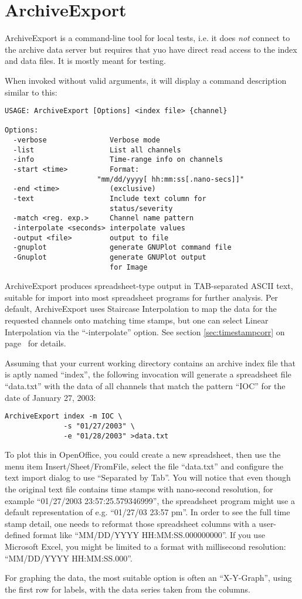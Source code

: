 \chapter{ArchiveExport}
ArchiveExport is a command-line tool for local tests, i.e. it does
\emph{not} connect to the archive data server but requires that
yuo have direct read access to the index and data files.
It is mostly meant for testing.

When invoked without valid arguments, it will display a command
description similar to this:

\begin{lstlisting}[frame=none,keywordstyle=\sffamily]
USAGE: ArchiveExport [Options] <index file> {channel}
 
Options:
  -verbose               Verbose mode
  -list                  List all channels
  -info                  Time-range info on channels
  -start <time>          Format:
                      "mm/dd/yyyy[ hh:mm:ss[.nano-secs]]"
  -end <time>            (exclusive)
  -text                  Include text column for
                         status/severity
  -match <reg. exp.>     Channel name pattern
  -interpolate <seconds> interpolate values
  -output <file>         output to file
  -gnuplot               generate GNUPlot command file
  -Gnuplot               generate GNUPlot output
                         for Image
\end{lstlisting}

\noindent ArchiveExport produces spreadsheet-type output in
TAB-separated ASCII text, suitable for import into most spreadsheet
programs for further analysis. Per default, ArchiveExport uses
Staircase Interpolation to map the data for the requested channels
onto matching time stamps, but one can select Linear Interpolation via
the ``-interpolate'' option. See section \ref{sec:timestampcorr} on
page~\pageref{sec:timestampcorr} for details.

Assuming that your current working directory contains an
archive index file that is aptly named ``index'', the following
invocation will generate a spreadsheet file ``data.txt'' with the data
of all channels that match the pattern ``IOC'' for the date of January
27, 2003:

\begin{lstlisting}[frame=none,keywordstyle=\sffamily]
ArchiveExport index -m IOC \
              -s "01/27/2003" \
              -e "01/28/2003" >data.txt
\end{lstlisting}

\noindent To plot this in OpenOffice, you could create a new
spreadsheet, then use the menu item Insert/Sheet/FromFile, select the
file ``data.txt'' and configure the text import dialog to use
``Separated by Tab''. You will notice that even though the original
text file contains time stamps with nano-second resolution, for
example ``01/27/2003 23:57:25.579346999'', the spreadsheet program
might use a default representation of e.g. 
``01/27/03 23:57 pm''.
In order to see the full time stamp detail, one needs to reformat
those spreadsheet columns with a user-defined format like
``MM/DD/YYYY HH:MM:SS.000000000''.
If you use Microsoft Excel, you might be limited to a format with
millisecond resolution: ``MM/DD/YYYY HH:MM:SS.000''.

For graphing the data, the most suitable option is often an
``X-Y-Graph'', using the first row for labels, with the data series
taken from the columns.

